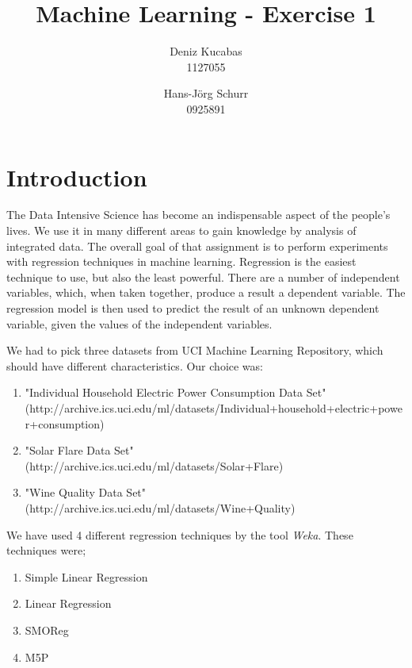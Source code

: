 \documentclass[a4paper]{article}
\begin{document}
\title{Machine Learning - Exercise 1 }
\author{
        Deniz Kucabas \\ 
                     1127055 
                    \and
                    Hans-Jörg Schurr \\ 0925891
}

\maketitle
\tableofcontents
\newpage

\section{Introduction}
The Data Intensive Science has become an indispensable aspect of the people's lives. We use it in many different areas to gain knowledge by analysis of integrated data. The overall goal of that assignment is to perform experiments with regression techniques in machine learning. Regression is the easiest technique to use, but also the least powerful. There are a number of independent variables, which, when taken together, produce a result a dependent variable. The regression model is then used to predict the result of an unknown dependent variable, given the values of the independent variables. 

We had to pick three datasets from UCI Machine Learning Repository, which should have different characteristics. 
Our choice was:
\begin{enumerate}
    \item "Individual Household Electric Power Consumption Data Set" \\ (http://archive.ics.uci.edu/ml/datasets/Individual+household+electric+power+consumption)
    \item "Solar Flare Data Set" \\
        (http://archive.ics.uci.edu/ml/datasets/Solar+Flare)
    \item "Wine Quality Data Set" \\
        (http://archive.ics.uci.edu/ml/datasets/Wine+Quality)
\end{enumerate}

We have used 4 different regression techniques by the tool \emph{Weka}. 
These techniques were;
\begin{enumerate}
    \item Simple Linear Regression
    \item Linear Regression
    \item SMOReg
    \item M5P
\end{enumerate}
\end{document}

